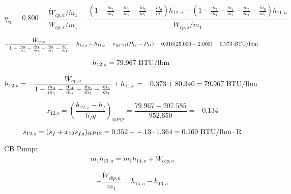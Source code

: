 \documentclass{article}
\begin{document}
\begin{equation}
\eta_{cp } =    0.800 = \frac{\dot{W}_{cp ,a} / \dot{m}_{1}}{\dot{W}_{cp ,s} / \dot{m}_{1}} = \frac{
(1 - \frac{\dot{m}_{ 3}}{\dot{m}_{ 1}} - \frac{\dot{m}_{ 4}}{\dot{m}_{ 1}} - \frac{\dot{m}_{ 5}}{\dot{m}_{ 1}} - \frac{\dot{m}_{ 6}}{\dot{m}_{ 1}})h_{12,a} - (1 - \frac{\dot{m}_{ 3}}{\dot{m}_{ 1}} - \frac{\dot{m}_{ 4}}{\dot{m}_{ 1}} - \frac{\dot{m}_{ 5}}{\dot{m}_{ 1}} - \frac{\dot{m}_{ 6}}{\dot{m}_{ 1}})h_{11,a}}{\dot{W}_{cp ,s} / \dot{m}_{1}}
\end{equation}

\begin{equation}
-\frac{\dot{W}_{cp,s}}{1 - \frac{\dot{m}_{ 3}}{\dot{m}_{ 1}} - \frac{\dot{m}_{ 4}}{\dot{m}_{ 1}} - \frac{\dot{m}_{ 5}}{\dot{m}_{ 1}} - \frac{\dot{m}_{ 6}}{\dot{m}_{ 1}}} = h_{12,s} - h_{11,s} = v_{@P11}(P_{12} - P_{11}) =    0.016(  25.000 -    2.000) =    0.373\textnormal{ BTU/lbm                   }
\end{equation}

\begin{equation}
  h_{12,s} =   79.967\textnormal{ BTU/lbm                   }
\end{equation}

\begin{equation}
h_{12,s} = -\frac{\dot{W}_{cp,s}}{1 - \frac{\dot{m}_{ 3}}{\dot{m}_{ 1}} - \frac{\dot{m}_{ 4}}{\dot{m}_{ 1}} - \frac{\dot{m}_{ 5}}{\dot{m}_{ 1}} - \frac{\dot{m}_{ 6}}{\dot{m}_{ 1}}} + h_{11,s} =   -0.373 +   80.340 =   79.967\textnormal{ BTU/lbm                   }
\end{equation}

\begin{equation}
x_{12.s} = (\frac{h_{12,s} - h_{f}}{h_fg})_{@P12} = \frac{  79.967 -  207.585}{ 952.650} =   -0.134
\end{equation}

\begin{equation}
  s_{12,s} = (s_{f} + x_{12}s_{fg})_{@P12} =    0.352 + -.13\cdot   1.364 =    0.169
\textnormal{ BTU/lbm}\cdot\textnormal{R}
\end{equation}


CB Pump:
\begin{equation}
\dot{m}_{ 1}h_{13,a} = \dot{m}_{ 1}h_{14,a} + \dot{W}_{cbp,a}
\end{equation}

\begin{equation}
-\frac{\dot{W}_{cbp,a}}{m_1} = h_{14,a} - h_{13,a}\end{equation}
\end{document}
